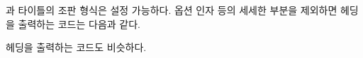 \cmd{\book}과 \cmd{\part} 타이틀의 조판 형식은 설정 가능하다. 옵션 인자 등의
세세한 부분을 제외하면 \cmd{\part} 헤딩을 출력하는 코드는 다음과 같다.
\begin{lcode}
\newcommand{\part}[1]{%
  \cleardoublepage         %
  \thispagestyle{part}     %
  \beforepartskip          %
  \printpartname\partnamenum\printpartnum
  \midpartskip             %
  \printparttitle{#1}      %
  \partpageend}            %
\newcommand{\partpageend}{%
  \afterpartskip
  }
\end{lcode}
\cmd{\book} 헤딩을 출력하는 코드도 비슷하다.

